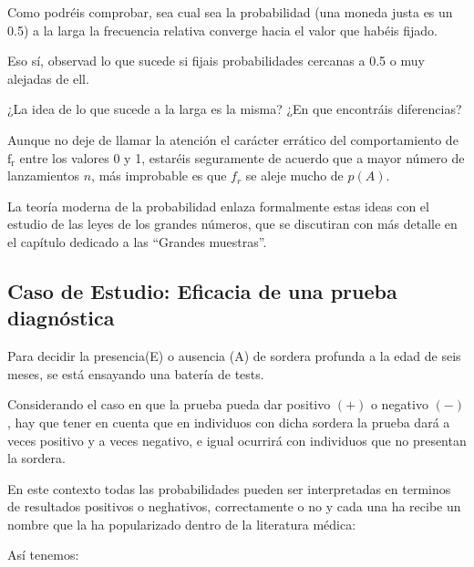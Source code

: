 \documentclass[
]{article}
\begin{document}
Como podréis comprobar, sea cual sea la probabilidad (una moneda justa es un 0.5) a la larga la frecuencia relativa converge hacia el valor que habéis fijado.

Eso sí, observad lo que sucede si fijais probabilidades cercanas a 0.5 o muy alejadas de ell.

¿La idea de lo que sucede a la larga es la misma? ¿En que encontráis diferencias?

Aunque no deje de llamar la atención el carácter errático del comportamiento de \(\mathrm{f}_{\mathrm{r}}\) entre los valores 0 y 1, estaréis seguramente de acuerdo que a mayor
número de lanzamientos \(n\), más improbable es que \(f_{r}\) se aleje
mucho de \(p(A)\).

La teoría moderna de la probabilidad enlaza formalmente estas ideas con
el estudio de las leyes de los grandes números, que se discutiran con más detalle en el capítulo dedicado a las ``Grandes muestras''.

\subsection{Caso de Estudio: Eficacia de una prueba diagnóstica}\label{caso-de-estudio-eficacia-de-una-prueba-diagnuxf3stica}

Para decidir la presencia(E) o ausencia (A) de sordera profunda a la edad de seis meses, se está ensayando una batería de tests.

Considerando el caso en que la prueba pueda dar positivo \((+)\) o negativo \((-)\), hay que tener en cuenta que en individuos con dicha sordera la prueba dará a veces positivo y a veces negativo, e igual ocurrirá con individuos que no presentan la sordera.

En este contexto todas las probabilidades pueden ser interpretadas en terminos de resultados positivos o neghativos, correctamente o no y cada una ha recibe un nombre que la ha popularizado dentro de la literatura médica:

Así tenemos:
\end{document}
